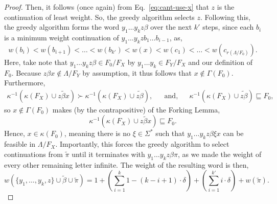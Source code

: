 \documentclass[11pt]{article}
\newcommand{\univ}{\Sigma}
\newcommand{\glang}{\Lambda}
\begin{document}
\begin{proof}
    Then, it follows (once again) from Eq.~\ref{eq:cant-use-x} that $z$ is the continuation of least weight.
    So, the greedy algorithm selects $z$.
    Following this, the greedy algorithm forms the word $y_1\ldots y_k z \beta$ over the next $k'$ steps, since each $b_i$ is a minimum weight continuation of $y_1\ldots y_k z b_1\ldots b_{i-1}$, as,
    $$w(b_i) < w(b_{i+1}) < \ldots < w(b_{k'}) < w(x) < w(c_1) < \ldots < w\left(c_{r(\glang/F_0)}\right).$$
    Here, take note that $y_1\ldots y_k z \beta \in F_0/F_X$ by $y_1\ldots y_k \in F_Y/F_X$ and our definition of $F_0$.
    Because $z\beta x \notin\glang/F_Y$ by assumption, it thus follows that $x\notin\Gamma(F_0)$.
    Furthermore,
    \begin{align*}
        \kappa^{-1}\left(\kappa(F_X) \cup \widetilde{z\beta x}\right) \succ \kappa^{-1}\left(\kappa(F_X) \cup \widetilde{z\beta}\right),&&\text{and},&&\kappa^{-1}\left(\kappa(F_X) \cup \widetilde{z\beta}\right) \sqsubseteq F_0,
    \end{align*}
    so $x\notin\Gamma(F_0)$ makes (by the contrapositive) of the Forking Lemma,
    \[
        \kappa^{-1}\left(\kappa(F_X) \cup \widetilde{z\beta x}\right) \sqsubseteq F_0.
    \]
    Hence, $x \in \kappa(F_0)$, meaning there is no $\xi\in\univ^*$ such that $y_1\ldots y_k z \beta \xi x$ can be feasible in $\glang/F_X$.
    Importantly, this forces the greedy algorithm to select continuations from $\widetilde{\pi}$ until it terminates with $y_1\ldots y_k z \beta \pi$, as we made the weight of every other remaining letter infinite.
    The weight of the resulting word is then,
    \begin{equation}\label{eq:greedy-value}
        w(\{y_1,\ldots, y_k, z\}\cup\widetilde{\beta}\cup\widetilde{\pi}) = 1 + \left(\sum_{i=1}^{k} 1 - (k-i + 1)\cdot \delta\right) + \left(\sum_{i=1}^{k'} i\cdot \delta\right) + w(\widetilde{\pi}).
    \end{equation}


\end{proof}
\end{document}
